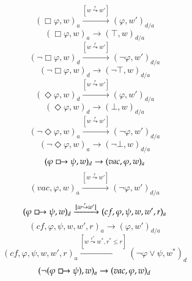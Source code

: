 \documentclass[a4paper,american]{paper}
\begin{document}
\begin{figure}[H]
	\centering
	\begin{equation}
		(\Box\varphi ,w)_a\xrightarrow{[w\overset{r}{\leadsto}w']} (\varphi ,w')_{d/a}
	\end{equation}
	\begin{equation}
		(\Box\varphi ,w)_a\rightarrow (\top ,w)_{d/a}
	\end{equation}
	\begin{equation}
		(\neg\Box\varphi ,w)_d\xrightarrow{[w\overset{r}{\leadsto}w']} (\neg\varphi ,w')_{d/a}
	\end{equation}
	\begin{equation}
		(\neg\Box\varphi ,w)_d\rightarrow (\neg\top ,w)_{d/a}
	\end{equation}
	\begin{equation}
		(\Diamond\varphi ,w)_d\xrightarrow{[w\overset{r}{\leadsto}w']} (\varphi ,w')_{d/a}
	\end{equation}
	\begin{equation}
		(\Diamond\varphi ,w)_d\rightarrow (\bot ,w)_{d/a}
	\end{equation}
	\begin{equation}
		(\neg\Diamond\varphi ,w)_a\xrightarrow{[w\overset{r}{\leadsto}w']} (\neg\varphi ,w')_{d/a}
	\end{equation}
	\begin{equation}
		(\neg\Diamond\varphi ,w)_a\rightarrow (\neg\bot ,w)_{d/a}
	\end{equation}
	\begin{equation}
		(\varphi\boxright\psi ,w)_d\rightarrow (vac,\varphi ,w)_a
	\end{equation}
	\begin{equation}
		(vac,\varphi ,w)_a\xrightarrow{[w\overset{r}{\leadsto}w']}(\neg\varphi ,w')_{d/a}
	\end{equation}
	\begin{equation}
		(\varphi\boxright\psi ,w)_d\xrightarrow{[w\overset{r}{\leadsto}w']}(cf,\varphi ,\psi ,w,w',r)_a
	\end{equation}
	\begin{equation}
		(cf,\varphi ,\psi ,w,w',r)_a\rightarrow (\varphi ,w')_{d/a}
	\end{equation}
	\begin{equation}
		(cf,\varphi ,\psi ,w,w',r)_a\xrightarrow{[w\overset{r^*}{\leadsto}w^*,r^*\leq r]}(\neg\varphi\vee\psi ,w^*)_d
	\end{equation}
	\begin{equation}
		(\neg (\varphi\boxright\psi ),w)_a\rightarrow (vac,\varphi ,w)_d

\end{equation}
\end{figure}
\end{document}
